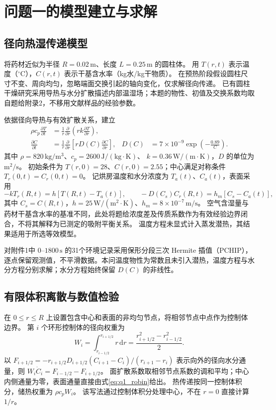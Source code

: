 \section{问题一的模型建立与求解}
\subsection{径向热湿传递模型}
将药材近似为半径 $R=0.02\,\mathrm m$、长度 $L=0.25\,\mathrm m$ 的圆柱体。
用 $T(r,t)$ 表示温度（$^\circ\mathrm C$），$C(r,t)$ 表示干基含水率（kg水/kg干物质）。
在预热阶段假设圆柱尺寸不变、周向均匀，忽略端面交换引起的轴向变化，仅求解径向传递。
已有圆柱干燥研究采用导热与水分扩散描述内部温湿场\cite{hussain2003}；本题的物性、初值及交换系数均取自题给附录2，不移用文献样品的经验参数。

依据径向导热与有效扩散关系，建立
\begin{align}
\rho c_p\frac{\partial T}{\partial t}
 &=\frac1r\frac{\partial}{\partial r}\left(rk\frac{\partial T}{\partial r}\right),\label{eq:q1_heat}\\
\frac{\partial C}{\partial t}
 &=\frac1r\frac{\partial}{\partial r}\left[rD(C)\frac{\partial C}{\partial r}\right],
 &D(C)&=7\times10^{-9}\exp\left(-\frac{0.89}{C}\right).\label{eq:q1_moisture}
\end{align}
其中 $\rho=820\,\mathrm{kg/m^3}$、$c_p=2600\,\mathrm{J/(kg\cdot K)}$、
$k=0.36\,\mathrm{W/(m\cdot K)}$，$D$ 的单位为 $\mathrm{m^2/s}$。
初始条件为 $T(r,0)=28$、$C(r,0)=2.55$；中心满足对称条件 $T_r(0,t)=C_r(0,t)=0$。
记烘房温度和水分浓度为 $T_a(t)$、$C_a(t)$，表面采用
\begin{equation}
-kT_r(R,t)=h[T(R,t)-T_a(t)],\qquad
-D(C_s)C_r(R,t)=h_m[C_s-C_a(t)],\label{eq:q1_robin}
\end{equation}
其中 $C_s=C(R,t)$，$h=25\,\mathrm{W/(m^2\cdot K)}$、$h_m=8\times10^{-7}\,\mathrm{m/s}$。
空气含湿量与药材干基含水率的基准不同，此处将题给浓度差及传质系数作为有效经验边界闭合，不将其解释为已测定的吸附平衡关系。
温度方程未显式计入蒸发潜热，其结果适用于所选等效模型。

对附件1中 $0$--$1800\,\mathrm s$ 的31个环境记录采用保形分段三次 Hermite 插值（PCHIP），
逐点保留观测值，不平滑数据。本问温度物性为常数且未引入潜热，温度方程与水分方程分别求解；水分方程始终保留 $D(C)$ 的非线性。

\subsection{有限体积离散与数值检验}
在 $0\le r\le R$ 上设置包含中心和表面的非均匀节点，将相邻节点中点作为控制体边界。
第 $i$ 个环形控制体的径向权重为
\begin{equation}
W_i=\int_{r_{i-1/2}}^{r_{i+1/2}}r\,\mathrm dr
=\frac{r_{i+1/2}^2-r_{i-1/2}^2}{2}.
\end{equation}
以 $F_{i+1/2}=-r_{i+1/2}D_{i+1/2}(C_{i+1}-C_i)/(r_{i+1}-r_i)$
表示向外的径向水分通量，则 $W_i\dot C_i=F_{i-1/2}-F_{i+1/2}$。
面扩散系数取相邻节点系数的调和平均；中心内侧通量为零，表面通量直接由式\eqref{eq:q1_robin}给出。
热传递按同一控制体积分，储热权重为 $\rho c_pW_i$。
该写法通过控制体积分处理中心，不在 $r=0$ 直接计算 $1/r$。

